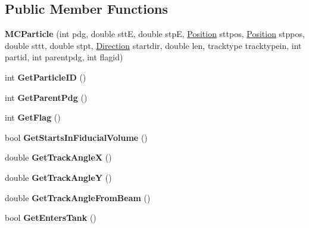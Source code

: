 \subsection*{Public Member Functions}
\begin{DoxyCompactItemize}
\item 
\hypertarget{classMCParticle_a1e2054a5aa6978bec68fa15133e9aae9}{
{\bfseries MCParticle} (int pdg, double sttE, double stpE, \hyperlink{classPosition}{Position} sttpos, \hyperlink{classPosition}{Position} stppos, double sttt, double stpt, \hyperlink{classDirection}{Direction} startdir, double len, tracktype tracktypein, int partid, int parentpdg, int flagid)}
\label{classMCParticle_a1e2054a5aa6978bec68fa15133e9aae9}

\item 
\hypertarget{classMCParticle_a351d384bc2af0918ece85ba38c9551b2}{
int {\bfseries GetParticleID} ()}
\label{classMCParticle_a351d384bc2af0918ece85ba38c9551b2}

\item 
\hypertarget{classMCParticle_a05c2ded23b19858448647ce9d2ba36fd}{
int {\bfseries GetParentPdg} ()}
\label{classMCParticle_a05c2ded23b19858448647ce9d2ba36fd}

\item 
\hypertarget{classMCParticle_a3240caaaac37a2d4ab3ef5d57aa53e74}{
int {\bfseries GetFlag} ()}
\label{classMCParticle_a3240caaaac37a2d4ab3ef5d57aa53e74}

\item 
\hypertarget{classMCParticle_a1829807b49dda47903441234983df064}{
bool {\bfseries GetStartsInFiducialVolume} ()}
\label{classMCParticle_a1829807b49dda47903441234983df064}

\item 
\hypertarget{classMCParticle_a99c79b20440359ee841296eff1a4ab61}{
double {\bfseries GetTrackAngleX} ()}
\label{classMCParticle_a99c79b20440359ee841296eff1a4ab61}

\item 
\hypertarget{classMCParticle_a98e706fd77669b0461e739b5a8e46998}{
double {\bfseries GetTrackAngleY} ()}
\label{classMCParticle_a98e706fd77669b0461e739b5a8e46998}

\item 
\hypertarget{classMCParticle_ae5bbdd4456fb3131ec6eb7213cab54cb}{
double {\bfseries GetTrackAngleFromBeam} ()}
\label{classMCParticle_ae5bbdd4456fb3131ec6eb7213cab54cb}

\item 
\hypertarget{classMCParticle_aa9626a1846b63292b5356fe2be097fe9}{
bool {\bfseries GetEntersTank} ()}
\label{classMCParticle_aa9626a1846b63292b5356fe2be097fe9}


\end{DoxyCompactItemize}
